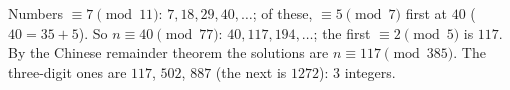 Numbers $\equiv7\pmod{11}$: $7,18,29,40,\dots$; of these, $\equiv5\pmod7$ first at $40$ ($40=35+5$). So $n\equiv40\pmod{77}$: $40,117,194,\dots$; the first $\equiv2\pmod5$ is $117$. By the Chinese remainder theorem the solutions are $n\equiv117\pmod{385}$. The three-digit ones are $117$, $502$, $887$ (the next is $1272$): $\boxed{3}$ integers.
